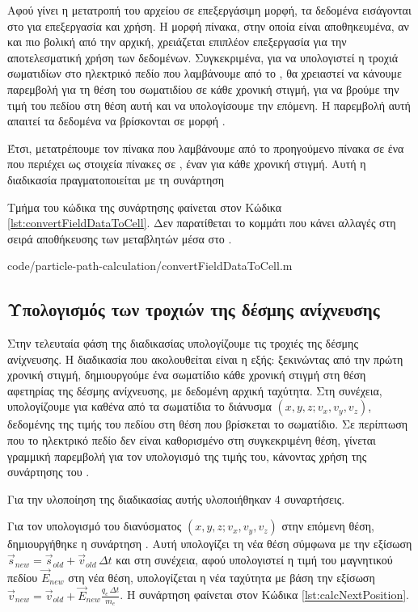 Αφού γίνει η μετατροπή του αρχείου σε επεξεργάσιμη μορφή, τα δεδομένα εισάγονται στο  για επεξεργασία και χρήση.
Η μορφή πίνακα, στην οποία είναι αποθηκευμένα, αν και πιο βολική από την αρχική, χρειάζεται επιπλέον επεξεργασία για την αποτελεσματική χρήση των δεδομένων.
Συγκεκριμένα, για να υπολογιστεί η τροχιά σωματιδίων στο ηλεκτρικό πεδίο που λαμβάνουμε από το , θα χρειαστεί να κάνουμε παρεμβολή για τη θέση του σωματιδίου σε κάθε χρονική στιγμή, για να βρούμε την τιμή του πεδίου στη θέση αυτή και να υπολογίσουμε την επόμενη. 
Η παρεμβολή αυτή απαιτεί τα δεδομένα να βρίσκονται σε μορφή .

Έτσι, μετατρέπουμε τον πίνακα που λαμβάνουμε από το προηγούμενο πίνακα σε ένα  που περιέχει ως στοιχεία πίνακες σε , έναν για κάθε χρονική στιγμή. 
Αυτή η διαδικασία πραγματοποιείται με τη συνάρτηση 

Τμήμα του κώδικα της συνάρτησης φαίνεται στον Κώδικα \ref{lst:convertFieldDataToCell}. 
Δεν παρατίθεται το κομμάτι που κάνει αλλαγές στη σειρά αποθήκευσης των μεταβλητών μέσα στο .


{code/particle-path-calculation/convertFieldDataToCell.m}

\subsection{Υπολογισμός των τροχιών της δέσμης ανίχνευσης}

Στην τελευταία φάση της διαδικασίας υπολογίζουμε τις τροχιές της δέσμης ανίχνευσης.
Η διαδικασία που ακολουθείται είναι η εξής: ξεκινώντας από την πρώτη χρονική στιγμή, δημιουργούμε ένα σωματίδιο κάθε χρονική στιγμή στη θέση αφετηρίας της δέσμης ανίχνευσης, με δεδομένη αρχική ταχύτητα.
Στη συνέχεια, υπολογίζουμε για καθένα από τα σωματίδια το διάνυσμα $\left(x, y, z; v_x, v_y, v_z\right)$, δεδομένης της τιμής  του πεδίου στη θέση που βρίσκεται το σωματίδιο.
Σε περίπτωση που το ηλεκτρικό πεδίο δεν είναι καθορισμένο στη συγκεκριμένη θέση, γίνεται γραμμική παρεμβολή για τον υπολογισμό της τιμής του, κάνοντας χρήση της συνάρτησης του  .

Για την υλοποίηση της διαδικασίας αυτής υλοποιήθηκαν 4 συναρτήσεις.

Για τον υπολογισμό του διανύσματος $\left(x, y, z; v_x, v_y, v_z\right)$ στην επόμενη θέση, δημιουργήθηκε η συνάρτηση .
Αυτή υπολογίζει τη νέα θέση σύμφωνα με την εξίσωση $\vec{s}_{new} = \vec{s}_{old} + \vec{v}_{old}\, \Delta t$ και στη συνέχεια, αφού υπολογιστεί η τιμή του μαγνητικού πεδίου $\vec{E}_{new}$ στη νέα θέση, υπολογίζεται η νέα ταχύτητα με βάση την εξίσωση $\vec{v}_{new} = \vec{v}_{old} + \vec{E}_{new} \frac{q_e \, \Delta t}{m_e}$.
Η συνάρτηση  φαίνεται στον Κώδικα \ref{lst:calcNextPosition}.

